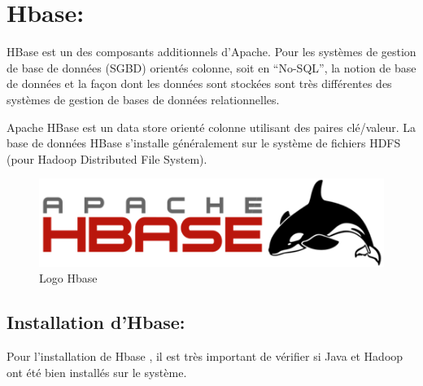 \section{Hbase:}

HBase est un  des composants additionnels d’Apache. Pour les systèmes de gestion de base de données (SGBD) orientés colonne, soit en “No-SQL”, la notion de base de données et la façon dont les données sont stockées sont très différentes des systèmes de gestion de bases de données relationnelles.

Apache HBase est un data store orienté colonne utilisant des paires clé/valeur. La base de données HBase s’installe généralement sur le système de fichiers HDFS (pour Hadoop Distributed File System).

\begin{figure}[h]
	\centering
    \includegraphics[scale=0.6]{img/part3/2.1}
    \caption{Logo Hbase}
\end{figure}

\subsection{Installation d'Hbase:}

Pour l'installation de Hbase , il est très important de vérifier si Java et Hadoop ont été bien installés sur le système.

